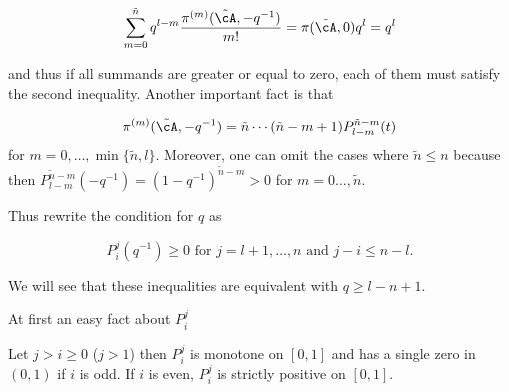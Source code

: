 $$
  \sum_{m=0}^{\tilde{n}}{q^{l-m}\frac{\pi^{(m)}(\tilde{\cA},-q^{-1})}{m!}}=\pi(\tilde{\cA},0)q^l=q^l
$$

and thus if all summands are greater or equal to zero, each of them must satisfy the second inequality. Another important fact is that

$$
  \pi^{(m)}(\tilde{\cA},-q^{-1})=\tilde{n}\cdots(\tilde{n}-m+1)P_{l-m}^{\tilde{n}-m}(t)
$$
for $m=0,\ldots,\min\{\tilde{n},l\}$. Moreover, one can omit the cases where $\tilde{n}\leq n$ because then $P_{l-m}^{\tilde{n}-m}(-q^{-1})=(1-q^{-1})^{\tilde{n}-m}>0$ for $m=0\ldots,\tilde{n}$.

Thus rewrite the condition for $q$ as

$$
  P_i^j(q^{-1})\geq 0 \text{ for } j=l+1,\ldots,n \text{ and } j-i\leq n-l\text{.}
$$

We will see that these inequalities are equivalent with $q\geq l-n+1$.

At first an easy fact about $P_i^j$

\begin{lemma}
  Let $j>i\geq 0$ ($j>1$) then $P_i^j$ is monotone on $[0,1]$ and has a single zero in $(0,1)$ if $i$ is odd.
  If $i$ is even, $P_i^j$ is strictly positive on $[0,1]$.
\end{lemma}

